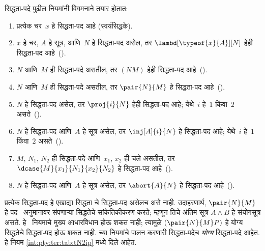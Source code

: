\begin{defn}
  सिद्धता-पदे पुढील नियमांनी विगमनाने तयार होतात:
  \begin{enumerate}
  \item प्रत्येक चर~$x$ हे सिद्धता-पद आहे (स्वयंसिद्धके).
  \item $x$ हे चर, $A$ हे सूत्र, आणि~$N$ हे
    सिद्धता-पद असेल, तर $\lambd[\typeof{x}{A}][N]$
    हेही सिद्धता-पद आहे~(\Intro\lif).
  \item $N$ आणि~$M$ ही सिद्धता-पदे असतील, तर $(NM)$
    हेही सिद्धता-पद आहे~(\Elim\lif).
  \item $N$ आणि~$M$ ही सिद्धता-पदे असतील, तर
    $\pair{N}{M}$ हे सिद्धता-पद आहे~(\Intro\land).
  \item $N$ हे सिद्धता-पद असेल, तर $\proj{i}{N}$
    हेही सिद्धता-पद आहे; येथे~$i$ हे~$1$ किंवा~$2$
    असते~(\Elim\land[i]).
  \item $N$ हे सिद्धता-पद आणि~$A$ हे सूत्र असेल,
    तर $\inj[A]{i}{N}$ हे सिद्धता-पद आहे; येथे~$i$
    हे~$1$ किंवा~$2$ असते~(\Intro\lor[i]).
  \item $M$, $N_1$, $N_2$ ही सिद्धता-पदे आणि~$x_1$,
    $x_2$ ही चले असतील, तर
    $\dcase{M}{x_1}{N_1}{x_2}{N_2}$ हे सिद्धता-पद
    आहे~(\Elim\lor).
  \item $N$ हे सिद्धता-पद आणि~$A$ हे सूत्र
    असेल, तर $\abort{A}{N}$ हे सिद्धता-पद आहे~(\FalseInt).
  \end{enumerate}
\end{defn}

प्रत्येक सिद्धता-पद हे एखाद्या सिद्धता चे
सिद्धता-पद असेलच असे नाही. उदाहरणार्थ,
$\pair{N}{M}$ हे पद~\Intro{\land} अनुमानावर
संपणाऱ्या सिद्धतेचे सांकेतिकीकरण करते; म्हणून तिचे
अंतिम सूत्र $A \land B$ हे संयोगसूत्र असते.
हे~\Elim{\lif} नियमाचे मुख्य आधारविधान होऊ शकत
नाही; त्यामुळे $(\pair{N}{M}P)$ हे योग्य सिद्धतेचे
सिद्धता-पद होऊ शकत नाही.  च्या नियमांचे
पालन करणारी सिद्धता-पदेच \emph{योग्य} सिद्धता-पदे
आहेत. हे नियम \ref{int:pty:ter:tab:tN2ip} मध्ये दिले आहेत.








